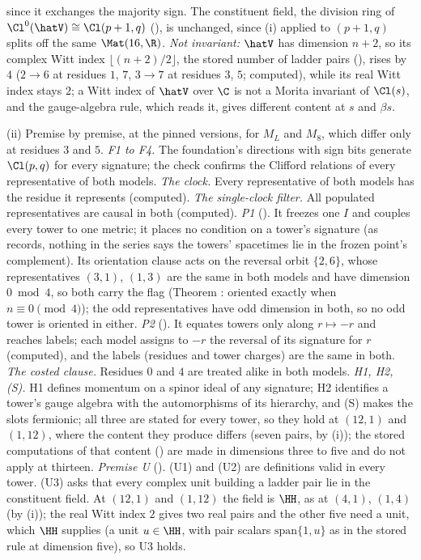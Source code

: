 since it exchanges the majority sign. The constituent field, the division ring of $\Cl^{0}(\hatV) \cong \Cl(p+1,q)$ (), is unchanged, since (i) applied to $(p+1,q)$ splits off the same $\Mat(16,\R)$. \emph{Not invariant:} $\hatV$ has dimension $n + 2$, so its complex Witt index $\lfloor(n+2)/2\rfloor$, the stored number of ladder pairs (), rises by $4$ ($2 \to 6$ at residues $1$, $7$, $3 \to 7$ at residues $3$, $5$; computed), while its real Witt index stays $2$; a Witt index of $\hatV$ over $\C$ is not a Morita invariant of $\Cl(s)$, and the gauge-algebra rule, which reads it, gives different content at $s$ and $\beta s$.

(ii) Premise by premise, at the pinned versions, for $M_{L}$ and $M_{8}$, which differ only at residues $3$ and $5$. \emph{F1 to F4.} The foundation's directions with sign bits generate $\Cl(p,q)$ for every signature; the check confirms the Clifford relations of every representative of both models. \emph{The clock.} Every representative of both models has the residue it represents (computed). \emph{The single-clock filter.} All populated representatives are causal in both (computed). \emph{P1} (). It freezes one $I$ and couples every tower to one metric; it places no condition on a tower's signature (as  records, nothing in the series says the towers' spacetimes lie in the frozen point's complement). Its orientation clause acts on the reversal orbit $\{2, 6\}$, whose representatives $(3,1)$, $(1,3)$ are the same in both models and have dimension $0 \bmod 4$, so both carry the flag (Theorem : oriented exactly when $n \equiv 0 \pmod 4$); the odd representatives have odd dimension in both, so no odd tower is oriented in either. \emph{P2} (). It equates towers only along $r \mapsto -r$ and reaches labels; each model assigns to $-r$ the reversal of its signature for $r$ (computed), and the labels (residues and tower charges) are the same in both. \emph{The costed clause.} Residues $0$ and $4$ are treated alike in both models. \emph{H1, H2, (S).} H1 defines momentum on a spinor ideal of any signature; H2 identifies a tower's gauge algebra with the automorphisms of its hierarchy, and (S) makes the slots fermionic; all three are stated for every tower, so they hold at $(12,1)$ and $(1,12)$, where the content they produce differs (seven pairs, by (i)); the stored computations of that content () are made in dimensions three to five and do not apply at thirteen. \emph{Premise U} (). (U1) and (U2) are definitions valid in every tower. (U3) asks that every complex unit building a ladder pair lie in the constituent field. At $(12,1)$ and $(1,12)$ the field is $\HH$, as at $(4,1)$, $(1,4)$ (by (i)); the real Witt index $2$ gives two real pairs and the other five need a unit, which $\HH$ supplies (a unit $u \in \HH$, with pair scalars $\mathrm{span}\{1, u\}$ as in the stored rule at dimension five), so U3 holds. 